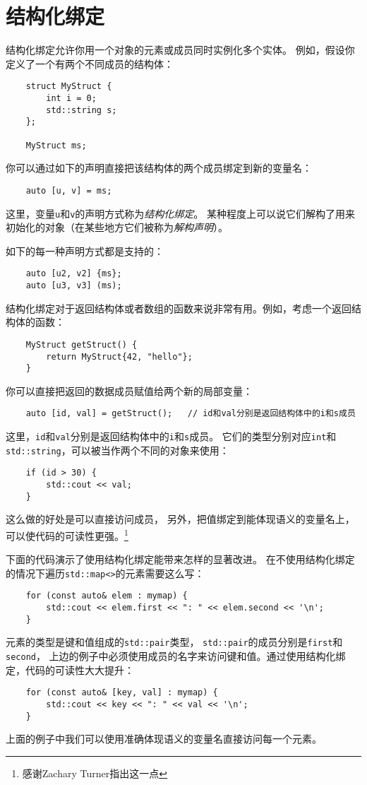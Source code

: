 \section{结构化绑定}\label{ch1}
结构化绑定允许你用一个对象的元素或成员同时实例化多个实体。
例如，假设你定义了一个有两个不同成员的结构体：
\begin{lstlisting}
    struct MyStruct {
        int i = 0;
        std::string s;
    };

    MyStruct ms;
\end{lstlisting}
你可以通过如下的声明直接把该结构体的两个成员绑定到新的变量名：
\begin{lstlisting}
    auto [u, v] = ms;
\end{lstlisting}
这里，变量\texttt{u}和\texttt{v}的声明方式称为\emph{结构化绑定}。
某种程度上可以说它们解构了用来初始化的对象（在某些地方它们被称为\emph{解构声明}）。

如下的每一种声明方式都是支持的：
\begin{lstlisting}
    auto [u2, v2] {ms};
    auto [u3, v3] (ms);
\end{lstlisting}
结构化绑定对于返回结构体或者数组的函数来说非常有用。例如，考虑一个返回结构体的函数：
\begin{lstlisting}
    MyStruct getStruct() {
        return MyStruct{42, "hello"};
    }
\end{lstlisting}
你可以直接把返回的数据成员赋值给两个新的局部变量：
\begin{lstlisting}
    auto [id, val] = getStruct();   // id和val分别是返回结构体中的i和s成员
\end{lstlisting}
这里，\texttt{id}和\texttt{val}分别是返回结构体中的\texttt{i}和\texttt{s}成员。
它们的类型分别对应\texttt{int}和\texttt{std::string}，可以被当作两个不同的对象来使用：
\begin{lstlisting}
    if (id > 30) {
        std::cout << val;
    }
\end{lstlisting}
这么做的好处是可以直接访问成员，
另外，把值绑定到能体现语义的变量名上，可以使代码的可读性更强。\footnote{感谢Zachary Turner指出这一点}

下面的代码演示了使用结构化绑定能带来怎样的显著改进。
在不使用结构化绑定的情况下遍历\texttt{std::map<>}的元素需要这么写：
\begin{lstlisting}
    for (const auto& elem : mymap) {
        std::cout << elem.first << ": " << elem.second << '\n';
    }
\end{lstlisting}
元素的类型是键和值组成的\texttt{std::pair}类型，
\texttt{std::pair}的成员分别是\texttt{first}和\texttt{second}，
上边的例子中必须使用成员的名字来访问键和值。通过使用结构化绑定，代码的可读性大大提升：
\begin{lstlisting}
    for (const auto& [key, val] : mymap) {
        std::cout << key << ": " << val << '\n';
    }
\end{lstlisting}
上面的例子中我们可以使用准确体现语义的变量名直接访问每一个元素。

